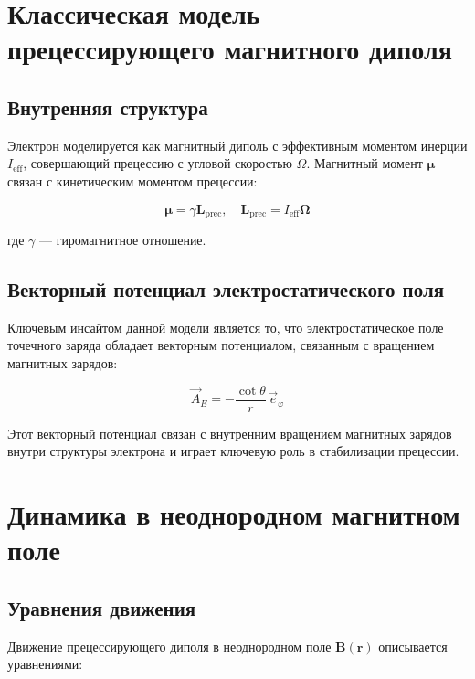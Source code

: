 \documentclass[12pt]{article}
\begin{document}
\section{Классическая модель прецессирующего магнитного диполя}

\subsection{Внутренняя структура}

Электрон моделируется как магнитный диполь с эффективным моментом инерции $I_{\text{eff}}$, совершающий прецессию с угловой скоростью $\Omega$. Магнитный момент $\boldsymbol{\mu}$ связан с кинетическим моментом прецессии:

\begin{equation}
\boldsymbol{\mu} = \gamma \boldsymbol{L}_{\text{prec}}, \quad \boldsymbol{L}_{\text{prec}} = I_{\text{eff}} \boldsymbol{\Omega}
\end{equation}

где $\gamma$ — гиромагнитное отношение.

\subsection{Векторный потенциал электростатического поля}

Ключевым инсайтом данной модели является то, что электростатическое поле точечного заряда обладает векторным потенциалом, связанным с вращением магнитных зарядов:

\begin{equation}
\vec{A}_E = -\frac{\cot\theta}{r} \, \vec{e}_\varphi
\end{equation}

Этот векторный потенциал связан с внутренним вращением магнитных зарядов внутри структуры электрона и играет ключевую роль в стабилизации прецессии.

\section{Динамика в неоднородном магнитном поле}

\subsection{Уравнения движения}

Движение прецессирующего диполя в неоднородном поле $\boldsymbol{B}(\boldsymbol{r})$ описывается уравнениями:
\end{document}

